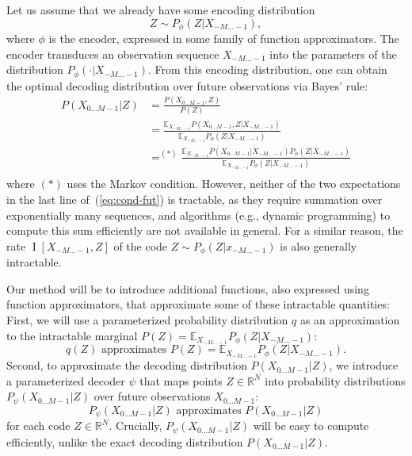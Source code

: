 \documentclass[entropy,article,submit,moreauthors,pdftex,10pt,a4paper]{Definitions/mdpi}
\newcommand{\E}[0]{\mathbb{E}}
\newcommand{\finitefuture}{X_{0\dots M-1}}
\begin{document}
Let us assume that we already have some encoding distribution
\begin{equation}
Z \sim P_\phi(Z|X_{-M\dots -1}),
\end{equation}
where $\phi$ is the encoder, expressed in some family of function approximators. The encoder transduces an observation sequence $X_{-M\dots -1}$ into the parameters of the distribution $P_\phi(\cdot|X_{-M\dots -1})$.
From this encoding distribution, one can obtain the optimal decoding distribution over future observations via Bayes' rule: %
\begin{equation}
	\label{eq:cond-fut}
	\begin{split}
	P(\finitefuture|Z) &= \frac{P(\finitefuture, Z)}{P(Z)} \\
	&= \frac{\E_{X_{-M \dots -1}} P(\finitefuture, Z|X_{-M\dots-1})}{\E_{X_{-M \dots -1}} P_\phi(Z|X_{-M \dots -1})} \\
	&=^{(*)} \frac{\E_{X_{-M \dots -1}}   P(\finitefuture|X_{-M\dots-1})     P_\phi(Z|X_{-M\dots-1})}{\E_{X_{-M \dots -1}} P_\phi(Z|X_{-M \dots -1})} \\
	\end{split}
\end{equation}
where $(*)$ uses the Markov condition.
However, neither of the two expectations in the last line of~(\ref{eq:cond-fut}) is tractable, as they require summation over exponentially many sequences, and algorithms (e.g., dynamic programming) to compute this sum efficiently are not available in general.
For a similar reason, the rate $\operatorname{I}[X_{-M\dots -1}, Z]$ of the code $Z \sim P_\phi(Z|x_{-M\dots -1})$ is also generally intractable.




Our method will be to introduce additional functions, also expressed using function approximators, that approximate some of these intractable quantities:
First, we will use a parameterized probability distribution $q$ as an approximation to the intractable marginal $P(Z) = \E_{X_{-M \dots -1}} P_\phi(Z|X_{-M \dots -1})$:
\begin{equation}
q(Z) \text{ approximates } P(Z) = \E_{X_{-M \dots -1}} P_\phi(Z|X_{-M \dots -1}).
\end{equation}
Second, to approximate the decoding distribution $P(\finitefuture|Z)$, we introduce a parameterized decoder $\psi$ that maps points $Z \in \mathbb{R}^N$  into probability distributions $P_\psi(\finitefuture|Z)$ over future observations $\finitefuture$:
\begin{equation}
P_\psi(\finitefuture|Z)  \text{ approximates }  P(\finitefuture|Z)
\end{equation}
for each code $Z \in \mathbb{R}^N$. Crucially, $P_\psi(\finitefuture|Z)$ will be easy to compute efficiently, unlike the exact decoding distribution $P(\finitefuture|Z)$.
\end{document}
